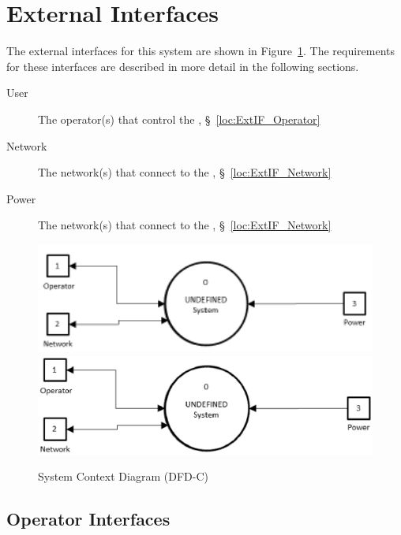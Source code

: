 \newpage
\section{External Interfaces}
\label{loc:ExternalInterfaces}


The external interfaces for this system are shown in Figure~\ref{fig:DFD-C}.
The requirements for these interfaces are described in more detail in the following sections.
\begin{description}
	\item[User] The operator(s) that control the \ThisSys, \S~\ref{loc:ExtIF_Operator}
	\item[Network] The network(s) that connect to the \ThisSys, \S~\ref{loc:ExtIF_Network}
	\item[Power] The network(s) that connect to the \ThisSys, \S~\ref{loc:ExtIF_Network}
\end{description}
\begin{figure}[htbp]
	\centering
			\ifpdf
			\includegraphics[width=6.5in]{../zProjectWideData/images/DFD-C_Image.pdf}
		\else
			\includegraphics[width=6.5in]{../zProjectWideData/images/DFD-C_300dpi_6.5inchesWide.eps}
		\fi
		\caption[System Context Diagram]{System Context Diagram (DFD-C)}
	\label{fig:DFD-C}
\end{figure}

\KNEADSUBSECTIONNEWPAGE
\subsection{Operator Interfaces}
\label{loc:ExtIF_Operator}

